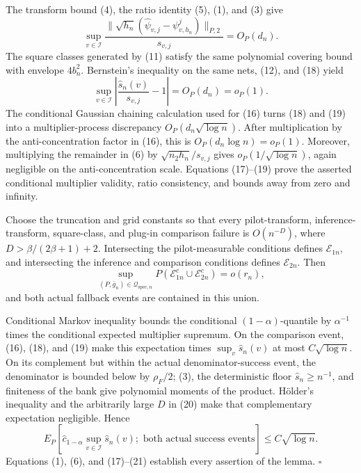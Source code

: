 The transform bound (4), the ratio identity (5), (1), and (3) give
\[
 \sup_{v\in\mathcal I}
 \frac{\|\sqrt{h_n}(\widehat\psi_{v,j}-\psi^j_{v,h_n})\|_{P,2}}{s_{v,j}}
 =O_P(d_n). \tag{18}
\]
The square classes generated by (11) satisfy the same polynomial covering bound with envelope \(4b_n^2\). Bernstein's inequality on the same nets, (12), and (18) yield
\[
 \sup_{v\in\mathcal I}\left|\frac{\widehat s_n(v)}{s_{v,j}}-1\right|=O_P(d_n)=o_P(1). \tag{19}
\]
The conditional Gaussian chaining calculation used for (16) turns (18) and (19) into a multiplier-process discrepancy \(O_P(d_n\sqrt{\log n})\). After multiplication by the anti-concentration factor in (16), this is \(O_P(d_n\log n)=o_P(1)\). Moreover, multiplying the remainder in (6) by \(\sqrt{n_2h_n}/s_{v,j}\) gives \(o_P(1/\sqrt{\log n})\), again negligible on the anti-concentration scale. Equations (17)--(19) prove the asserted conditional multiplier validity, ratio consistency, and bounds away from zero and infinity.

Choose the truncation and grid constants so that every pilot-transform, inference-transform, square-class, and plug-in comparison failure is \(O(n^{-D})\), where \(D>\beta/(2\beta+1)+2\). Intersecting the pilot-measurable conditions defines \(\mathcal E_{1n}\), and intersecting the inference and comparison conditions defines \(\mathcal E_{2n}\). Then
\[
 \sup_{(P,\bar g_n)\in\mathcal Q_{\mathrm{spec},n}}
 P(\mathcal E_{1n}^c\cup\mathcal E_{2n}^c)=o(r_n), \tag{20}
\]
and both actual fallback events are contained in this union.

Conditional Markov inequality bounds the conditional \((1-\alpha)\)-quantile by \(\alpha^{-1}\) times the conditional expected multiplier supremum. On the comparison event, (16), (18), and (19) make this expectation times \(\sup_v\widehat s_n(v)\) at most \(C\sqrt{\log n}\). On its complement but within the actual denominator-success event, the denominator is bounded below by \(\rho_F/2\); (3), the deterministic floor \(\widehat s_n\ge n^{-1}\), and finiteness of the bank give polynomial moments of the product. H\"older's inequality and the arbitrarily large \(D\) in (20) make that complementary expectation negligible. Hence
\[
 E_P\!\left[\widehat c_{1-\alpha}\sup_{v\in\mathcal I}\widehat s_n(v);
 \text{ both actual success events}\right]\le C\sqrt{\log n}. \tag{21}
\]
Equations (1), (6), and (17)--(21) establish every assertion of the lemma. \(\square\)